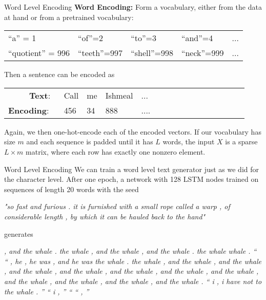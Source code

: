 \documentclass[10pt, table, dvipsnames,xcdraw, handout]{beamer}
\begin{document}
\begin{frame}[fragile]{Word Level Encoding}
\textbf{Word Encoding:} Form a vocabulary, either from the data at hand or from a pretrained vocabulary:
\begin{center}
\begin{tabular}{lllll}
``a'' = 1& ``of''=2 & ``to''=3 & ``and''=4 &...
\\
``quotient'' = 996& ``teeth''=997 & ``shell''=998 & ``neck''=999&...
\end{tabular}
\end{center}
Then a sentence can be encoded as
\begin{center}
\begin{tabular}{rlllllllllllllll}
\textbf{Text}:\,\,\,\,&Call&me&Ishmeal& ...
\\
\textbf{Encoding}: \,\,\,& 456&34&888&....
\end{tabular}
\end{center}

Again, we then one-hot-encode each of the encoded vectors. If our vocabulary has size $m$ and each sequence is padded until it has $L$ words, the input $X$ is a sparse $L\times m$ matrix, where each row has exactly one nonzero element. 
\end{frame}


\begin{frame}[fragile]{Word Level Encoding}
We can train a word level text generator just as we did for the character level. After one epoch, a network with 128 LSTM nodes trained on sequences of length 20 words with the seed 

\emph{"so fast and furious . it is furnished with a small rope called a warp , of considerable length , by which it can be hauled back to the hand"}

generates

\emph{ , and the whale . the whale , and the whale , and the whale . the whale whale . “ “ , he , he was , and he was the whale . the whale , and the whale , and the whale , and the whale , and the whale , and the whale , and the whale , and the whale , and the whale , and the whale , and the whale , and the whale . “ i , i have not to the whale . ” “ i , ” “ “ , ”}
\end{frame}
\end{document}

